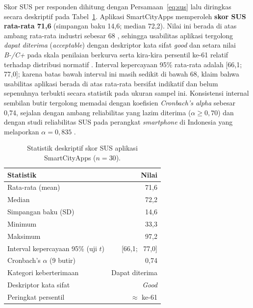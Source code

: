 Skor SUS per responden dihitung dengan Persamaan~\ref{eq:sus} lalu diringkas secara deskriptif pada Tabel~\ref{tab:sus-deskriptif}. Aplikasi SmartCityApps memperoleh \textbf{skor SUS rata-rata 71,6} (simpangan baku 14,6; median 72,2). Nilai ini berada di atas ambang rata-rata industri sebesar 68 \citep{bangorDeterminingWhatIndividual2009}, sehingga usabilitas aplikasi tergolong \textit{dapat diterima} (\textit{acceptable}) dengan deskriptor kata sifat \textit{good} \citep{bangorEmpiricalEvaluation2008} dan setara nilai \textit{B-/C+} pada skala penilaian berkurva serta kira-kira persentil ke-61 relatif terhadap distribusi normatif \citep{lewisSauroPastPresent2018}. Interval kepercayaan 95\% rata-rata adalah [66,1; 77,0]; karena batas bawah interval ini masih sedikit di bawah 68, klaim bahwa usabilitas aplikasi berada di atas rata-rata bersifat indikatif dan belum sepenuhnya terbukti secara statistik pada ukuran sampel ini. Konsistensi internal sembilan butir tergolong memadai dengan koefisien \textit{Cronbach's alpha} sebesar 0,74, sejalan dengan ambang reliabilitas yang lazim diterima ($\alpha \geq 0{,}70$) dan dengan studi reliabilitas SUS pada perangkat \textit{smartphone} di Indonesia yang melaporkan $\alpha = 0{,}835$ \citep{usmanGustalikaPengujianValiditas2022}.

\begin{table}[htbp]
\centering
\small
\caption{Statistik deskriptif skor SUS aplikasi SmartCityApps ($n = 30$).}
\label{tab:sus-deskriptif}
\begin{tabular}{l r}
\toprule
\textbf{Statistik} & \textbf{Nilai} \\
\midrule
Rata-rata (mean) & 71,6 \\
Median & 72,2 \\
Simpangan baku (SD) & 14,6 \\
Minimum & 33,3 \\
Maksimum & 97,2 \\
Interval kepercayaan 95\% (uji $t$) & [66,1; \, 77,0] \\
Cronbach's $\alpha$ (9 butir) & 0,74 \\
\midrule
Kategori keberterimaan \citep{bangorDeterminingWhatIndividual2009} & Dapat diterima \\
Deskriptor kata sifat \citep{bangorEmpiricalEvaluation2008} & \textit{Good} \\
Peringkat persentil \citep{lewisSauroPastPresent2018} & $\approx$ ke-61 \\
\bottomrule
\end{tabular}
\end{table}

